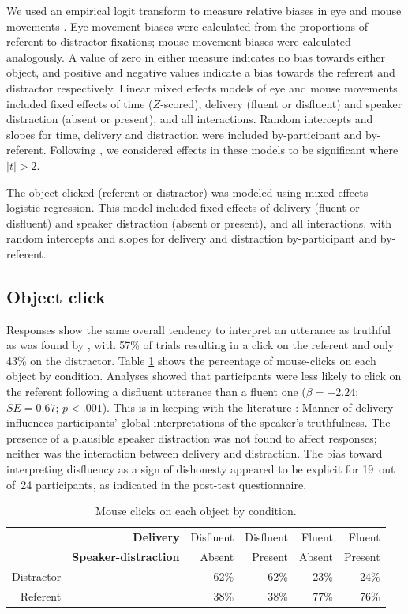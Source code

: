 \documentclass[a4paper,man,natbib]{apa6}
\newcommand*{\SE}{\mathit{SE}} %
\begin{document}
We used an empirical logit transform to measure relative biases in eye and mouse movements \citep{Barr2008}.
Eye movement biases were calculated from the proportions of referent to distractor fixations;
mouse movement biases were calculated analogously.
A value of zero in either measure indicates no bias towards either object, and positive and negative values indicate a bias towards the referent and distractor respectively.
Linear mixed effects models of eye and mouse movements included fixed effects of time ($Z$-scored), delivery (fluent or disfluent) and speaker distraction (absent or present), and all interactions.
Random intercepts and slopes for time, delivery and distraction were included by-participant and by-referent.
Following \citet{baayen2008analyzing}, we considered effects in these models to be significant where $|t|>2$.

The object clicked (referent or distractor) was modeled using mixed effects logistic regression.
This model included  fixed effects of delivery (fluent or disfluent) and speaker distraction (absent or present), and all interactions, with random intercepts and slopes for delivery and distraction by-participant and by-referent.

\subsection{Object click}
Responses show the same overall tendency to interpret an utterance as truthful as was found by \citet{Loy2016}, with 57\% of trials resulting in a click on the referent and only 43\% on the distractor.
Table \ref{table:objctclck} shows the percentage of mouse-clicks on each object by condition.
Analyses showed that participants were less likely to click on the referent following a disfluent utterance than a fluent one ($\beta = -2.24$; $\SE = 0.67$; $p<.001$). 
This is in keeping with the literature \citep{depaulo2003cues,Zuckerman1981}:
Manner of delivery influences participants' global interpretations of the speaker's truthfulness. 
The presence of a plausible speaker distraction was not found to affect responses; neither was the interaction between delivery and distraction. 
The bias toward interpreting disfluency as a sign of dishonesty appeared to be explicit for 19~out of~24 participants, as indicated in the post-test questionnaire. 



\begin{table}[ht]
\centering
\caption{Mouse clicks on each object by condition.}
\label{table:objctclck}
\begin{tabular}{rrrrrr}
  \hline
& \textbf{Delivery} & Disfluent & Disfluent & Fluent & Fluent \\ 
& \textbf{Speaker-distraction} & Absent & Present & Absent & Present \\
  \hline
Distractor & &  62\% &  62\% &  23\% &  24\% \\ 
  Referent & &  38\% &  38\% &  77\% &  76\% \\ 
   \hline
\end{tabular}
\end{table}
\end{document}
